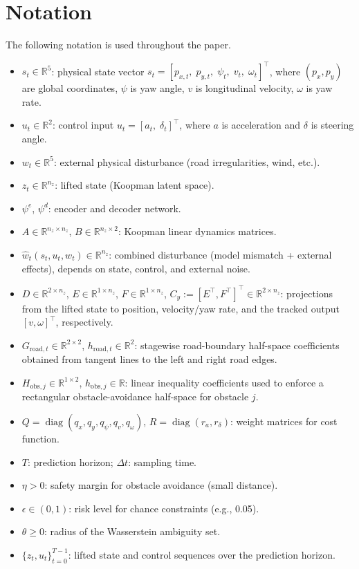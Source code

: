 \documentclass[pdflatex,sn-mathphys,Numbered]{sn-jnl}
\numberwithin{equation}{section}
\begin{document}
	\section*{Notation}
	\label{sec:notation}
	The following notation is used throughout the paper.
	\begin{itemize}
		\item $s_t \in \mathbb{R}^5$: physical state vector $s_t = [p_{x,t},\; p_{y,t},\; \psi_t,\; v_t,\; \omega_t]^\top$, where $(p_x,p_y)$ are global coordinates, $\psi$ is yaw angle, $v$ is longitudinal velocity, $\omega$ is yaw rate.
		\item $u_t \in \mathbb{R}^2$: control input $u_t = [a_t,\; \delta_t]^\top$, where $a$ is acceleration and $\delta$ is steering angle.
		\item $w_t \in \mathbb{R}^5$: external physical disturbance (road irregularities, wind, etc.).
		\item $z_t \in \mathbb{R}^{n_z}$: lifted state (Koopman latent space).
		\item $\psi^e$, $\psi^d$: encoder and decoder network.
		\item $A \in \mathbb{R}^{n_z \times n_z}$, $B \in \mathbb{R}^{n_z \times 2}$: Koopman linear dynamics matrices.
		\item $\hat{w}_t(s_t,u_t,w_t) \in \mathbb{R}^{n_z}$: combined disturbance (model mismatch + external effects), depends on state, control, and external noise.
		\item $D \in \mathbb{R}^{2\times n_z}$, $E \in \mathbb{R}^{1\times n_z}$, $F \in \mathbb{R}^{1\times n_z}$, $C_y := [E^\top,F^\top]^\top \in \mathbb{R}^{2\times n_z}$: projections from the lifted state to position, velocity/yaw rate, and the tracked output $[v,\omega]^\top$, respectively.
		\item $G_{\text{road},t} \in \mathbb{R}^{2\times 2}$, $h_{\text{road},t} \in \mathbb{R}^{2}$: stagewise road-boundary half-space coefficients obtained from tangent lines to the left and right road edges.
		\item $H_{\text{obs},j} \in \mathbb{R}^{1\times 2}$, $h_{\text{obs},j} \in \mathbb{R}$: linear inequality coefficients used to enforce a rectangular obstacle-avoidance half-space for obstacle $j$.
		\item $Q = \operatorname{diag}(q_x,q_y,q_\psi,q_v,q_\omega)$, $R = \operatorname{diag}(r_a,r_\delta)$: weight matrices for cost function.
		\item $T$: prediction horizon; $\Delta t$: sampling time.
		\item $\eta > 0$: safety margin for obstacle avoidance (small distance).
		\item $\epsilon \in (0,1)$: risk level for chance constraints (e.g., 0.05).
		\item $\theta \ge 0$: radius of the Wasserstein ambiguity set.
		\item $\{z_t,u_t\}_{t=0}^{T-1}$: lifted state and control sequences over the prediction horizon.
	\end{itemize}
	
\end{document}
